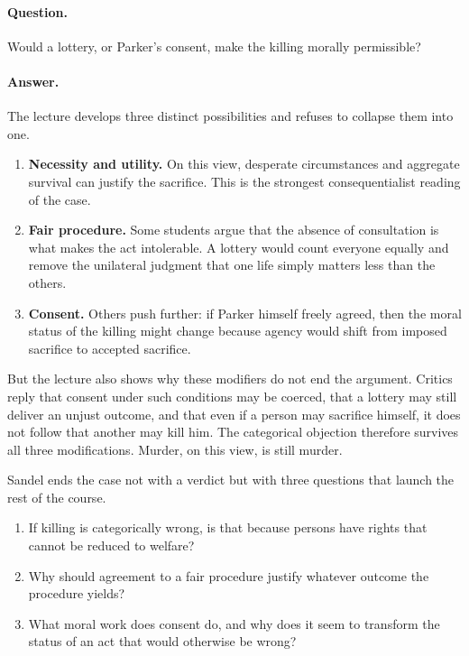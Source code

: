 \paragraph{Question.} Would a lottery, or Parker's consent, make the killing morally permissible?

\paragraph{Answer.} The lecture develops three distinct possibilities and refuses to collapse them into one.

\begin{enumerate}
\item \textbf{Necessity and utility.} On this view, desperate circumstances and aggregate survival can justify the sacrifice. This is the strongest consequentialist reading of the case.
\item \textbf{Fair procedure.} Some students argue that the absence of consultation is what makes the act intolerable. A lottery would count everyone equally and remove the unilateral judgment that one life simply matters less than the others.
\item \textbf{Consent.} Others push further: if Parker himself freely agreed, then the moral status of the killing might change because agency would shift from imposed sacrifice to accepted sacrifice.
\end{enumerate}

But the lecture also shows why these modifiers do not end the argument. Critics reply that consent under such conditions may be coerced, that a lottery may still deliver an unjust outcome, and that even if a person may sacrifice himself, it does not follow that another may kill him. The categorical objection therefore survives all three modifications. Murder, on this view, is still murder.

Sandel ends the case not with a verdict but with three questions that launch the rest of the course.

\begin{enumerate}
\item If killing is categorically wrong, is that because persons have rights that cannot be reduced to welfare?
\item Why should agreement to a fair procedure justify whatever outcome the procedure yields?
\item What moral work does consent do, and why does it seem to transform the status of an act that would otherwise be wrong?
\end{enumerate}

